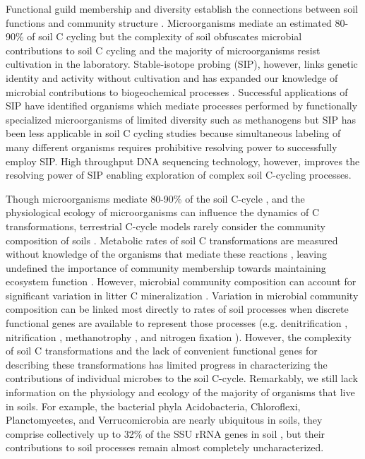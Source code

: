 Functional guild membership and diversity establish the connections between
soil functions and community structure \citep{O_Donnell_2002}. Microorganisms
mediate an estimated 80-90\% of soil C cycling
\citep{ColemanCrossley_1996,Nannipieri_2003} but the complexity of soil
obfuscates microbial contributions to soil C cycling and the majority of
microorganisms resist cultivation in the laboratory. Stable-isotope probing
(SIP), however, links genetic identity and activity without cultivation and has
expanded our knowledge of microbial contributions to biogeochemical processes
\citep{Chen_Murrell_2010}. Successful applications of SIP have identified
organisms which mediate processes performed by functionally specialized
microorganisms of limited diversity such as methanogens \citep{Lu_2005} but SIP
has been less applicable in soil C cycling studies because simultaneous
labeling of many different organisms requires prohibitive resolving power to
successfully employ SIP. High throughput DNA sequencing technology, however,
improves the resolving power of SIP enabling exploration of complex soil
C-cycling processes.

Though microorganisms mediate 80-90\% of the soil C-cycle
\citep{ColemanCrossley_1996,Nannipieri_2003}, and the physiological ecology of
microorganisms can influence the dynamics of C transformations, terrestrial
C-cycle models rarely consider the community composition of soils
\citep{Zak2006,Reed2007}. Metabolic rates of soil C transformations are
measured without knowledge of the organisms that mediate these reactions
\citep{Nannipieri_2003}, leaving undefined the importance of community
membership towards maintaining ecosystem function
\citep{Nannipieri_2003,Schimel_2012,Allison_2008}. However, microbial community
composition can account for significant variation in litter C mineralization
\citep{Strickland_2009}. Variation in microbial community composition can be
linked most directly to rates of soil processes when discrete functional genes
are available to represent those processes (e.g. denitrification
\citep{Cavigelli2000}, nitrification \citep{Carney2004,Hawkes2005,Webster2005},
methanotrophy \citep{Gulledge1997}, and nitrogen fixation \citep{Hsu2009}).
However, the complexity of soil C transformations and the lack of convenient
functional genes for describing these transformations has limited progress in
characterizing the contributions of individual microbes to the soil C-cycle.
Remarkably, we still lack information on the physiology and ecology of the
majority of organisms that live in soils. For example, the bacterial phyla
Acidobacteria, Chloroflexi, Planctomycetes, and Verrucomicrobia are nearly
ubiquitous in soils, they comprise collectively up to 32\% of the SSU rRNA
genes in soil \citep{Janssen2006,Buckley2002}, but their contributions to soil
processes remain almost completely uncharacterized. 

